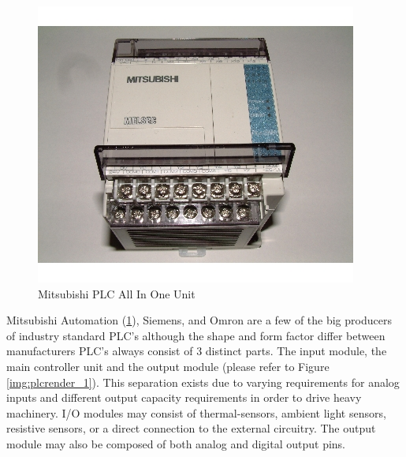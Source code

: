 \begin{figure}[htp]
    \centering
    \includegraphics[width=\imgsmlphoto]{./images/c01_mitsubishiplc.jpg}
    \caption{Mitsubishi PLC All In One Unit \cite{img_c01_MitsubishiPlc}}
    \label{img:mitsubishiplc}
\end{figure}
Mitsubishi Automation (\ref{img:mitsubishiplc}), Siemens, and Omron are a few of the big
 producers of industry standard PLC's although the shape and form factor differ between 
 manufacturers PLC's always consist of 3 distinct parts.  The input module, the main 
 controller unit and the output module (please refer to Figure \ref{img:plcrender_1}). 
 This separation exists due to varying requirements for analog inputs and different output 
 capacity requirements in order to drive heavy machinery. I/O modules may consist of 
 thermal-sensors, ambient light sensors, resistive sensors, or a direct connection to the 
 external circuitry. The output module may also be composed of both analog and digital output pins.
 
